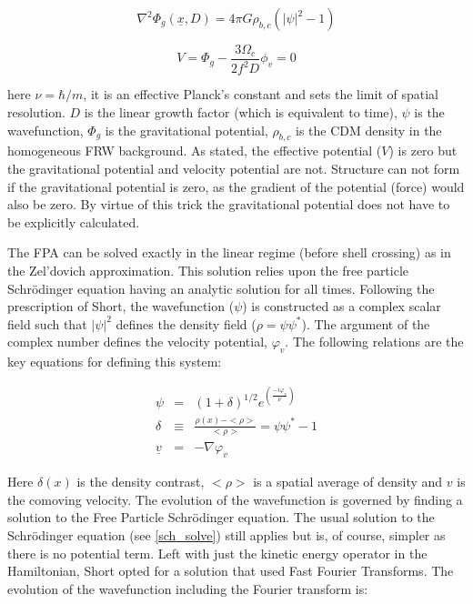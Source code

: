 \begin{equation}
\label{eqn_poifpa}
\nabla^2\Phi_g(\underline{x},D) = 4\pi G\rho_{b,c}(|\psi|^2 -1)
\end{equation}

\begin{equation}
V = \Phi_g - \frac{3 \Omega_c}{2f^2 D}\phi_v = 0
\end{equation}

\noindent here $\nu = \hbar /m$, it is an effective Planck's constant and sets the limit of spatial resolution. $D$ is the linear growth factor (which is equivalent to time), $\psi$ is the wavefunction, $\Phi_g$ is the gravitational potential, $\rho_{b,c}$ is the CDM density in the homogeneous FRW background. As stated, the effective potential ($V$) is zero but the gravitational potential and velocity potential are not. Structure can not form if the gravitational potential is zero, as the gradient of the potential (force) would also be zero. By virtue of this trick the gravitational potential does not have to be explicitly calculated.

The FPA can be solved exactly in the linear regime (before shell crossing) as in the Zel'dovich approximation. This solution relies upon the free particle Schr\"odinger equation having an analytic solution for all times. Following the prescription of Short, the wavefunction ($\psi$) is constructed as a complex scalar field such that $|\psi|^2$ defines the density field ($\rho=\psi\psi^*$). The argument of the complex number defines the velocity potential, $\varphi_v$. The following relations are the key equations for defining this system:

\begin{eqnarray}
\label{fpa_equations}
 \psi &=& (1+ \delta)^{1/2}e^{\left(\frac{-i\varphi_v}{\nu}\right)} \nonumber \\
 \delta &\equiv& \frac{\rho(x) - <\rho>}{<\rho>} = \psi\psi^* -1  \nonumber \\
 \underline{v} &=& -\nabla \varphi_v
\end{eqnarray}

\noindent Here $\delta(x)$ is the density contrast, $<\rho>$ is a spatial average of density and $v$ is the comoving velocity. The evolution of the wavefunction is governed by finding a solution to the Free Particle Schr\"odinger equation. The usual solution to the Schr\"odinger equation (see \ref{sch_solve}) still applies but is, of course, simpler as there is no potential term. Left with just the kinetic energy operator in the Hamiltonian, Short opted for a solution that used Fast Fourier Transforms. The evolution of the wavefunction including the Fourier transform is:


